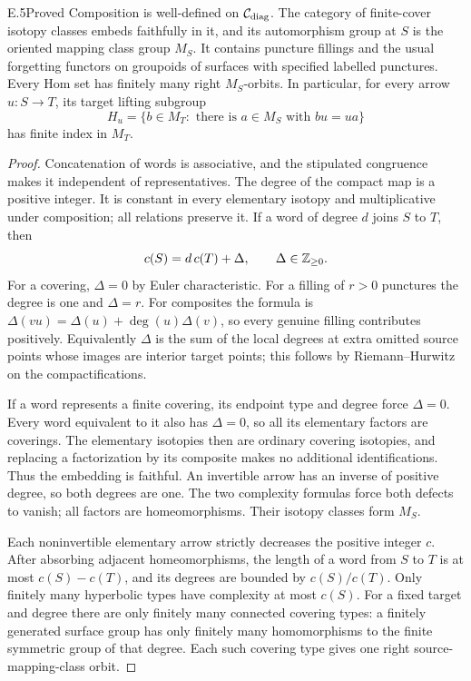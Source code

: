 \begin{claim}{E.5}{Proved}
Composition is well-defined on $\mathcal C_{\rm diag}$.
The category of finite-cover isotopy classes embeds faithfully in
it, and its automorphism group at $S$ is the oriented mapping
class group $M_S$. It contains puncture fillings and the usual
forgetting functors on groupoids of surfaces with specified
labelled punctures. Every Hom set has finitely many right
$M_S$-orbits. In particular, for every arrow $u:S\to T$, its
target lifting subgroup
\[
 H_u=\{b\in M_T:\text{ there is }a\in M_S
                          \text{ with }bu=ua\}
\]
has finite index in $M_T$.
\end{claim}
\begin{proof}
Concatenation of words is associative, and the stipulated congruence
makes it independent of representatives. The degree of the compact
map is a positive integer. It is constant in every elementary
isotopy and multiplicative under composition; all relations preserve
it. If a word of degree $d$ joins $S$ to $T$, then
\[
                  c(S)=d\,c(T)+\Delta,
                       \qquad \Delta\in\mathbb Z_{\geq0}.
\]
For a covering, $\Delta=0$ by Euler characteristic. For a filling
of $r>0$ punctures the degree is one and $\Delta=r$.
For composites the formula is
$\Delta(vu)=\Delta(u)+\deg(u)\Delta(v)$, so every genuine
filling contributes positively. Equivalently $\Delta$ is the sum
of the local degrees at extra omitted source points whose images
are interior target points; this follows by Riemann--Hurwitz on
the compactifications.

If a word represents a finite covering, its endpoint type and
degree force $\Delta=0$. Every word equivalent to it also has
$\Delta=0$, so all its elementary factors are coverings.
The elementary isotopies then are ordinary covering isotopies,
and replacing a factorization by its composite makes no additional
identifications. Thus the embedding is faithful. An invertible
arrow has an inverse of positive degree, so both degrees are one.
The two complexity formulas force both defects to vanish; all
factors are homeomorphisms. Their isotopy classes form $M_S$.

Each noninvertible elementary arrow strictly decreases the positive
integer $c$. After absorbing adjacent homeomorphisms, the length
of a word from $S$ to $T$ is at most $c(S)-c(T)$, and its degrees
are bounded by $c(S)/c(T)$. Only finitely many hyperbolic types
have complexity at most $c(S)$. For a fixed target and degree
there are only finitely many connected covering types: a finitely
generated surface group has only finitely many homomorphisms to
the finite symmetric group of that degree. Each such covering
type gives one right source-mapping-class orbit.


\end{proof}

